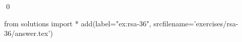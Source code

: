
\begin{ex} 
  \label{ex:rsa-36}
  
  \qed
\end{ex} 
\begin{python0}
from solutions import *
add(label="ex:rsa-36",
    srcfilename='exercises/rsa-36/answer.tex') 
\end{python0}
